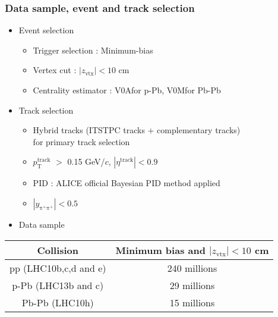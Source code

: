 \begin{frame}
\frametitle{Data sample, event and track selection}
\begin{itemize}
\item{Event selection}
	\begin{itemize}
	\item{Trigger selection : Minimum-bias}
	\item{Vertex cut : $|z_\mathrm{vtx}|<10$ cm}
	\item{Centrality estimator : V0A\footnotemark[1] for p-Pb, V0M\footnotemark[2] for Pb-Pb}
	\end{itemize}
\item{Track selection}
	\begin{itemize}
	\item{Hybrid tracks (ITSTPC tracks + complementary tracks)\\ for primary track selection}
	\item{$p_\mathrm{T}^\mathrm{track}$ $>$ 0.15 GeV/$c$, $|\eta^\mathrm{track}|<0.9$}
	\item{PID : ALICE official Bayesian PID method applied  }
	\item{$|y_\mathrm{\pi^{+}\pi^{+}}|<0.5$}
	\end{itemize}
\item{Data sample}
\end{itemize}

\begin{table}[htp]
\begin{center}
\begin{tabular}{|c|c|}
\hline
Collision & Minimum bias and $|z_\mathrm{vtx}|<10$ cm \\ 
\hline
pp (LHC10b,c,d and e) & 240 millions \\
p-Pb (LHC13b and c) & 29 millions\\
Pb-Pb (LHC10h) & 15 millions\\
\hline

\end{tabular}
\end{center}
\label{default}
\end{table}%
\end{frame}


